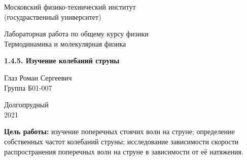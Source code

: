 \documentclass[a4paper, 12pt]{article} %
\begin{document}


\begin{titlepage}

    \newpage
    \begin{center}
        \normalsize Московский физико-технический институт \\(госудраственный университет)
    \end{center}

    \vspace{6em}

    \begin{center}
        \Large Лабораторная работа по общему курсу физики\\Термодинамика и молекулярная физика
    \end{center}

    \vspace{1em}

    \begin{center}
        \Large \textbf{1.4.5. Изучение колебаний струны}
    \end{center}

    \vspace{2em}

    \begin{center}
        \large Глаз Роман Сергеевич\\
        Группа Б01-007
    \end{center}

    \vspace{\fill}

    \begin{center}
        Долгопрудный \\2021
    \end{center}
    
\end{titlepage}


    \thispagestyle{empty}
    \newpage
    \tableofcontents
    \newpage
    \setcounter{page}{1}




\textbf{Цель работы:}  изучение поперечных стоячих волн на струне; определение собственных частот колебаний струны; исследование зависимости скорости распространения
поперечных волн на струне в зависимости от её натяжения.\\
\end{document}
